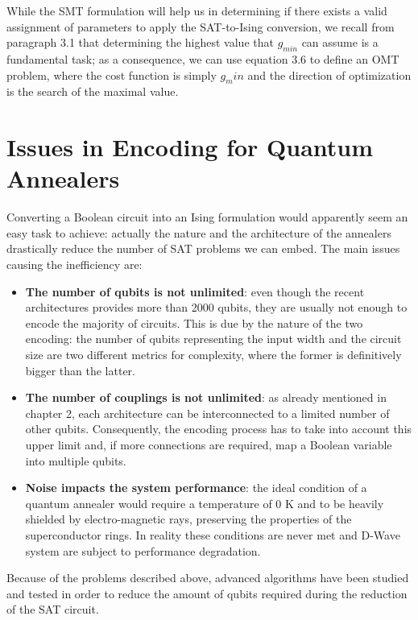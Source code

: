 While the SMT formulation will help us in determining if there exists a valid assignment of parameters to apply the SAT-to-Ising conversion, we recall from paragraph 3.1 that determining the highest value that $g_{min}$ can assume is a fundamental task; as a consequence, we can use equation 3.6 to define an OMT problem, where the cost function is simply $g_min$ and the direction of optimization is the search of the maximal value.

\section{Issues in Encoding for Quantum Annealers}

Converting a Boolean circuit into an Ising formulation would apparently seem an easy task to achieve: actually the nature and the architecture of the annealers drastically reduce the number of SAT problems we can embed. The main issues causing the inefficiency are:

\begin{itemize}
    \item \textbf{The number of qubits is not unlimited}: even though the recent architectures provides more than 2000 qubits, they are usually not enough to encode the majority of circuits.
    This is due by the nature of the two encoding: the number of qubits representing the input width and the circuit size are two different metrics for complexity, where the former is definitively bigger than the latter. 
    \item \textbf{The number of couplings is not unlimited}: as already mentioned in chapter 2, each architecture can be interconnected to a limited number of other qubits. Consequently, the encoding process has to take into account this upper limit and, if more connections are required, map a Boolean variable into multiple qubits.
    \item \textbf{Noise impacts the system performance}: the ideal condition of a quantum annealer would require a temperature of 0 K and to be heavily shielded by electro-magnetic rays, preserving the properties of the superconductor rings. In reality these conditions are never met and D-Wave system are subject to performance degradation.
\end{itemize}

Because of the problems described above, advanced algorithms have been studied and tested in order to reduce the amount of qubits required during the reduction of the SAT circuit.

